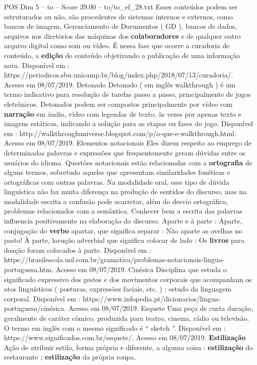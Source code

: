 \begin{textsample}{POS Dim 5 – to – Score 39.00 – to/to\_ef\_28.txt}
Esses conteúdos podem ser estruturados ou não, são procedentes de sistemas internos e externos, como bancos de imagem, Gerenciamento de Documentos ( GD ), bancos de dados, arquivos nos diretórios das máquinas dos \textbf{colaboradores} e de qualquer outro arquivo digital como som ou vídeo.
É nessa fase que ocorre a curadoria de conteúdo, a \textbf{edição} de conteúdo objetivando a publicação de uma informação nova.
Disponível em : https://periodicos.sbu.unicamp.br/blog/index.php/2018/07/13/curadoria/.
Acesso em 08/07/2019.
Detonado Detonado ( em inglês walkthrough ) é um termo indicativo para resolução de tarefas passo a passo, principalmente de jogos eletrônicos.
Detonados podem ser compostos principalmente por vídeo com \textbf{narração} em áudio, vídeo com legendas de texto, às vezes por apenas texto e imagens estáticas, indicando a solução para as etapas ou fases do jogo.
Disponível em : http://walkthroughuniverse.blogspot.com/p/o-que-e-walkthrough.html.
Acesso em 08/07/2019.
Elementos notacionais Eles dizem respeito ao emprego de determinadas palavras e expressões que frequentemente geram dúvidas entre os usuários do idioma.
Questões notacionais estão relacionadas com a \textbf{ortografia} de alguns termos, sobretudo aqueles que apresentam similaridades fonéticas e ortográficas com outras palavras.
Na modalidade oral, esse tipo de dúvida linguística não faz muita diferença na produção de sentidos do discurso, mas na modalidade escrita a confusão pode acarretar, além do desvio ortográfico, problemas relacionados com a semântica.
Conhecer bem a escrita das palavras influencia positivamente na elaboração do discurso.
Aparte e à parte : Aparte, conjugação do \textbf{verbo} apartar, que significa separar : Não aparte as ovelhas no pasto!
À parte, locução adverbial que significa colocar de lado : Os \textbf{livros} para doação foram colocados à parte.
Disponível em : https://brasilescola.uol.com.br/gramatica/problemas-notacionais-lingua-portuguesa.htm.
Acesso em 08/07/2019.
Cinésica Disciplina que estuda o significado expressivo dos gestos e dos movimentos corporais que acompanham os atos linguísticos ( posturas, expressões faciais, etc. ) ; estudo da linguagem corporal.
Disponível em : https://www.infopedia.pt/dicionarios/lingua-portuguesa/cinésica.
Acesso em 08/07/2019.
Esquete Uma peça de curta duração, geralmente de caráter cômico, produzida para teatro, cinema, rádio ou televisão.
O termo em inglês com o mesmo significado é “ sketch ”.
Disponível em : https://www.significados.com.br/esquete/.
Acesso em 08/07/2019. \textbf{Estilização} Ação de atribuir estilo, forma própria e diferente, a alguma coisa : \textbf{estilização} do restaurante ; \textbf{estilização} da própria roupa.

\end{textsample}
